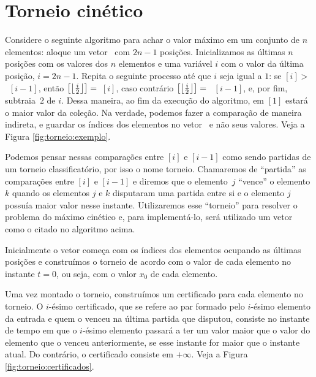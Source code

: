 
\newcommand{\thickness}{0.75mm}
\FloatBarrier
\section{Torneio cinético} \label{torneio:secao}

Considere o seguinte algoritmo para achar o valor máximo em um
conjunto de $n$ elementos: aloque um vetor \torneio~com $2n - 1$
posições. Inicializamos as últimas $n$ posições com os valores dos
$n$ elementos e uma variável $i$ com o valor da última posição, $i =
2n - 1$. Repita o seguinte processo até que $i$ seja igual a $1$: se
\torneio$[i] > $~\torneio$[i - 1]$, então
\torneio$\left[\left\lfloor \frac{i}{2} \right\rfloor\right] =$~\torneio$[i]$, caso
contrário \torneio$\left[\left\lfloor \frac{i}{2} \right\rfloor\right] =$~ \torneio$[i
- 1]$, e, por fim, subtraia~$2$ de $i$. Dessa maneira, ao fim da
execução do algoritmo, em \torneio$[1]$ estará o maior valor da
coleção. Na verdade, podemos fazer a comparação de maneira indireta,
e guardar os índices dos elementos no vetor \torneio~e não seus
valores. Veja a Figura \ref{fig:torneio:exemplo}.

Podemos pensar nessas comparações entre \torneio$[i]$ e
\torneio$[i-1]$ como sendo partidas de um torneio classificatório,
por isso o nome torneio. Chamaremos de ``partida'' as comparações
entre \torneio$[i]$ e \torneio$[i-1]$ e diremos que o elemento~$j$
``vence'' o elemento $k$ quando os elementos $j$ e $k$ disputaram
uma partida entre si e o elemento $j$ possuía maior valor nesse
instante. Utilizaremos esse ``torneio'' para resolver o problema do
máximo cinético e, para implementá-lo, será utilizado um vetor como
o citado no algoritmo acima.



Inicialmente o vetor começa com os índices dos elementos ocupando as
últimas posições e construímos o torneio de acordo com o valor de
cada elemento no instante $t = 0$, ou seja, com o valor $x_0$ de
cada elemento.

Uma vez montado o torneio, construímos um certificado para cada
elemento no torneio. O $i$-ésimo certificado, que se refere ao par
formado pelo $i$-ésimo elemento da entrada e quem o venceu na última
partida que disputou, consiste no instante de tempo em que o
$i$-ésimo elemento passará a ter um valor maior que o valor do
elemento que o venceu anteriormente, se esse instante for maior que
o instante atual. Do contrário, o certificado consiste em $+\infty$.
Veja a Figura \ref{fig:torneio:certificados}.

